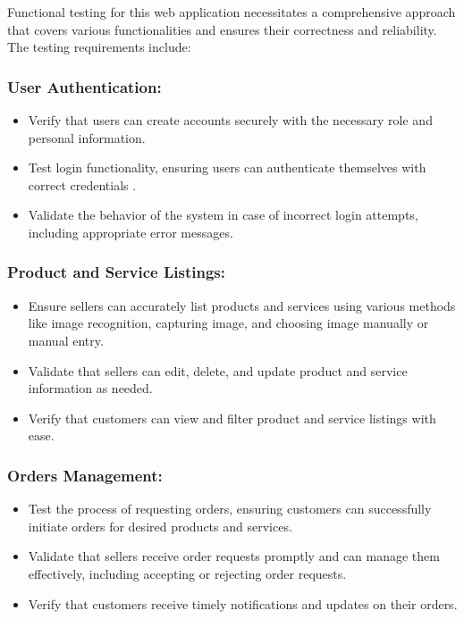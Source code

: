 Functional testing for this web application necessitates a comprehensive approach that covers various functionalities and ensures their correctness and reliability. The testing requirements include:

\subsubsection{User Authentication:}
	\begin{itemize}
		\item Verify that users can create accounts securely with the necessary role and personal information.
		\item Test login functionality, ensuring users can authenticate themselves with correct credentials \citep{oauth-spec}.
		\item Validate the behavior of the system in case of incorrect login attempts, including appropriate error messages.
	\end{itemize}
	
\subsubsection{Product and Service Listings:}
	\begin{itemize}
		\item Ensure sellers can accurately list products and services using various methods like image recognition, capturing image, and choosing image manually or manual entry.
		\item Validate that sellers can edit, delete, and update product and service information as needed.
		\item Verify that customers can view and filter product and service listings with ease.
	\end{itemize}
	
\subsubsection{Orders Management:}
	\begin{itemize}
		\item Test the process of requesting orders, ensuring customers can successfully initiate orders for desired products and services.
		\item Validate that sellers receive order requests promptly and can manage them effectively, including accepting or rejecting order requests.
		\item Verify that customers receive timely notifications and updates on their orders.
	\end{itemize}
	

